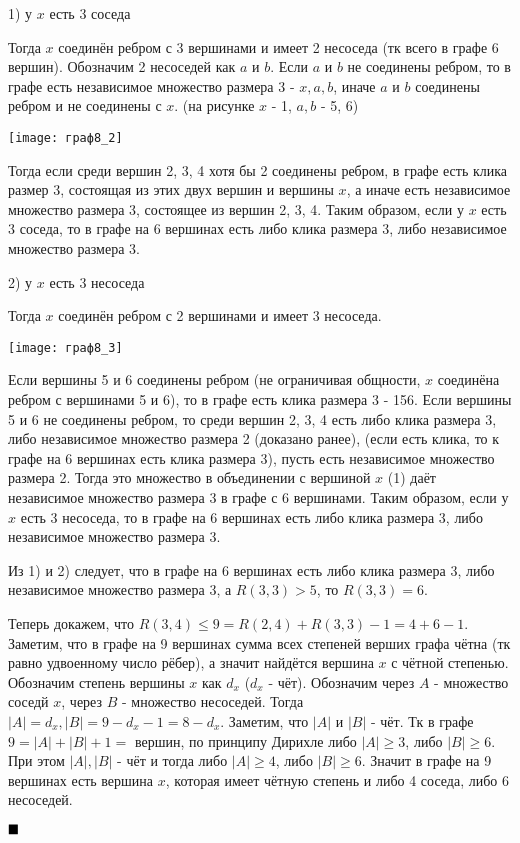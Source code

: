 \documentclass[a4paper, 16pt]{article}
\newenvironment{proof}[1][Доказательство]{%
	\begin{trivlist}
		\item[\hskip \labelsep {\bfseries #1:}]
		\item \hspace{14pt}
	}{
		$ \hfill\blacksquare $
	\end{trivlist}
	\hfill\break
}
\begin{document}
\begin{proof}
			1) у $x$ есть 3 соседа
			
				Тогда $x$ соединён ребром с 3 вершинами и имеет 2 несоседа (тк всего в графе 6 вершин). Обозначим 2 несоседей как $a$ и $b$. Если $a$ и $b$ не соединены ребром, то в графе есть независимое множество размера 3 - $x, a, b$, иначе $a$ и $b$ соединены ребром и не соединены с $x$.  (на рисунке $x$ - 1, $a, b$ - 5, 6)
				
				\texttt{[image: граф8\_2]}
				
				Тогда если среди вершин 2, 3, 4 хотя бы 2 соединены ребром, в графе есть клика размер 3, состоящая из этих двух вершин и вершины $x$, а иначе есть независимое множество размера 3, состоящее из вершин 2, 3, 4. Таким образом, если у $x$ есть 3 соседа, то в графе на 6 вершинах есть либо клика размера 3, либо независимое множество размера 3.
				
			2) у $x$ есть 3 несоседа
			
			Тогда $x$ соединён ребром с 2 вершинами и имеет 3 несоседа.
			
			\texttt{[image: граф8\_3]}
			
			Если вершины 5 и 6 соединены ребром (не ограничивая общности, $x$ соединёна ребром с вершинами 5 и 6), то в графе есть клика размера 3 - 156. Если вершины 5 и 6 не соединены ребром, то среди вершин 2, 3, 4 есть либо клика размера 3, либо независимое множество размера 2 (доказано ранее), (если есть клика, то к графе на 6 вершинах есть клика размера 3), пусть есть независимое множество размера 2. Тогда это множество в объединении с вершиной $x$ (1) даёт независимое множество размера 3 в графе с 6 вершинами. Таким образом, если у $x$ есть 3 несоседа, то в графе на 6 вершинах есть либо клика размера 3, либо независимое множество размера 3.
			
			Из 1) и 2) следует, что в графе на 6 вершинах есть либо клика размера 3, либо независимое множество размера 3, а $R(3,3) > 5$, то $R(3,3) = 6$.
			
		Теперь докажем, что $R(3,4) \leq 9 = R(2, 4)  +R(3, 3) - 1= 4 + 6 - 1$. Заметим, что в графе на 9 вершинах сумма всех степеней верших графа чётна (тк равно удвоенному число рёбер), а значит найдётся вершина $x$ с чётной степенью. Обозначим степень вершины $x$ как $d_x$ ($d_x$ - чёт). Обозначим через $A$ - множество соседй $x$, через $B$ - множество несоседей. Тогда $|A| = d_x, |B| = 9 - d_x - 1 = 8 - d_x$. Заметим, что $|A|$ и $|B|$ - чёт. Тк в графе $9 = |A| + |B| + 1 = $ вершин, по принципу Дирихле либо $|A| \geq 3$, либо $|B| \geq 6$. При этом $|A|,|B| $ - чёт и тогда либо $|A| \geq 4$, либо $|B| \geq 6$. Значит в графе на 9 вершинах есть вершина $x$, которая имеет чётную степень и либо 4 соседа, либо 6 несоседей.
		

\end{proof}
\end{document}
